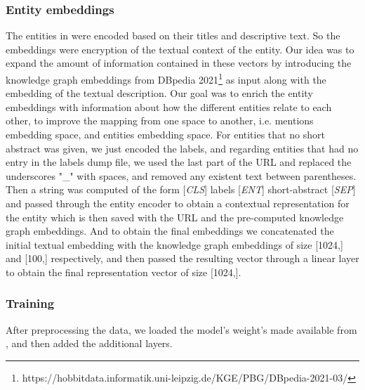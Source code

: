 \subsubsection{Entity embeddings}
The entities in \cite{Wu2020} were encoded based on their titles and descriptive text. So the embeddings were encryption of the textual context of the entity. Our idea was to expand the amount of information contained in these vectors by introducing the knowledge graph embeddings from DBpedia 2021\footnote{https://hobbitdata.informatik.uni-leipzig.de/KGE/PBG/DBpedia-2021-03/} as input along with the embedding of the textual description.\newline
Our goal was to enrich the entity embeddings with information about how the different entities relate to each other, to improve the mapping from one space to another, i.e. mentions embedding space, and entities embedding space.\newline
For entities that no short abstract was given, we just encoded the labels, and regarding entities that had no entry in the labels dump file, we used the last part of the URL and replaced the underscores "\_" with spaces, and removed any existent text between parentheses.\newline
Then a string was computed of the form [\textit{CLS}] labels [\textit{ENT}] short-abstract [\textit{SEP}] and passed through the entity encoder to obtain a contextual representation for the entity which is then saved with the URL and the pre-computed knowledge graph embeddings.\newline
And to obtain the final embeddings we concatenated the initial textual embedding with the knowledge graph embeddings of size [1024,] and [100,] respectively, and then passed the resulting vector through a linear layer to obtain the final representation vector of size [1024,].\newline

\subsubsection{Training}
After preprocessing the data, we loaded the model's weight's made available from \cite{Wu2020}, and then added the additional layers. 

